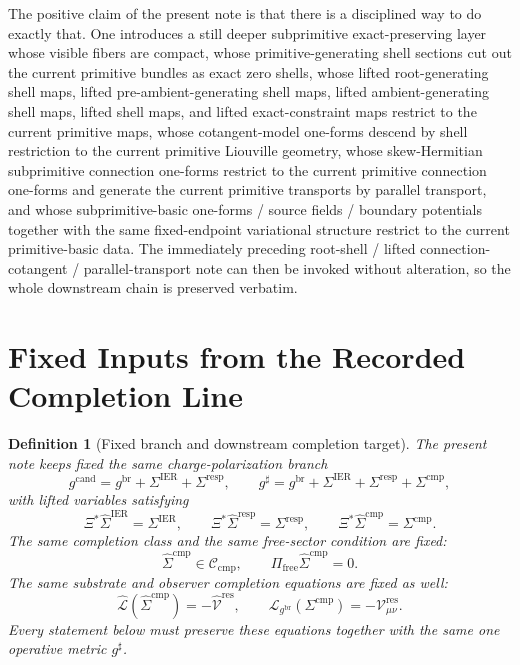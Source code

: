 \documentclass[11pt]{article}
\newcommand{\ObserverMap}{\Xi}
\newcommand{\ObserverMetric}{g^{\mathrm{br}}}
\newcommand{\CandidateMetric}{g^{\mathrm{cand}}}
\newcommand{\CompletedMetric}{g^{\sharp}}
\newcommand{\BaseShift}{\Sigma^{\mathrm{IER}}}
\newcommand{\ResponseShift}{\Sigma^{\mathrm{resp}}}
\newcommand{\CompShift}{\Sigma^{\mathrm{cmp}}}
\newcommand{\BaseLift}{\widehat\Sigma^{\mathrm{IER}}}
\newcommand{\ResponseLift}{\widehat\Sigma^{\mathrm{resp}}}
\newcommand{\CompLift}{\widehat\Sigma^{\mathrm{cmp}}}
\newcommand{\ResidualCore}{\mathcal V_{\mu\nu}^{\mathrm{res}}}
\newcommand{\ResidualLift}{\widehat{\mathcal V}^{\mathrm{res}}}
\newcommand{\SubReducedEin}{\widehat{\mathcal L}}
\newcommand{\FreeProj}{\Pi_{\mathrm{free}}}
\newcommand{\ReducedEin}{\mathcal L_{\ObserverMetric}}
\newcommand{\CompClass}{\mathscr C_{\mathrm{cmp}}}
\newtheorem{definition}{Definition}
\begin{document}
The positive claim of the present note is that there is a disciplined way to do exactly that. One introduces a still deeper subprimitive exact-preserving layer whose visible fibers are compact, whose primitive-generating shell sections cut out the current primitive bundles as exact zero shells, whose lifted root-generating shell maps, lifted pre-ambient-generating shell maps, lifted ambient-generating shell maps, lifted shell maps, and lifted exact-constraint maps restrict to the current primitive maps, whose cotangent-model one-forms descend by shell restriction to the current primitive Liouville geometry, whose skew-Hermitian subprimitive connection one-forms restrict to the current primitive connection one-forms and generate the current primitive transports by parallel transport, and whose subprimitive-basic one-forms / source fields / boundary potentials together with the same fixed-endpoint variational structure restrict to the current primitive-basic data. The immediately preceding root-shell / lifted connection-cotangent / parallel-transport note can then be invoked without alteration, so the whole downstream chain is preserved verbatim.

\section{Fixed Inputs from the Recorded Completion Line}

\begin{definition}[Fixed branch and downstream completion target]
\label{def:fixed_branch}
The present note keeps fixed the same charge-polarization branch
\begin{equation}
\CandidateMetric
=
\ObserverMetric+\BaseShift+\ResponseShift,
\qquad
\CompletedMetric
=
\ObserverMetric+\BaseShift+\ResponseShift+\CompShift,
\label{eq:fixed_metrics}
\end{equation}
with lifted variables satisfying
\begin{equation}
\ObserverMap^*\BaseLift=\BaseShift,
\qquad
\ObserverMap^*\ResponseLift=\ResponseShift,
\qquad
\ObserverMap^*\CompLift=\CompShift.
\label{eq:fixed_lifts}
\end{equation}
The same completion class and the same free-sector condition are fixed:
\begin{equation}
\CompLift\in\CompClass,
\qquad
\FreeProj\CompLift=0.
\label{eq:fixed_free}
\end{equation}
The same substrate and observer completion equations are fixed as well:
\begin{equation}
\SubReducedEin(\CompLift)=-\ResidualLift,
\qquad
\ReducedEin(\CompShift)=-\ResidualCore.
\label{eq:fixed_solves}
\end{equation}
Every statement below must preserve these equations together with the same one operative metric \(\CompletedMetric\).
\end{definition}
\end{document}
